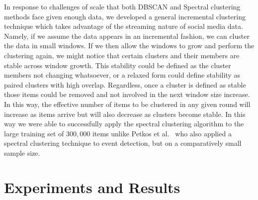 \documentclass{../acm_proc_article-me11_tweaked}
\begin{document}
In response to challenges of scale that both DBSCAN and Spectral clustering methods face given enough data, we developed a general incremental clustering technique which takes advantage of the streaming nature of social media data. Namely, if we assume the data appears in an incremental fashion, we can cluster the data in small windows. If we then allow the windows to grow and perform the clustering again, we might notice that certain clusters and their members are stable across window growth. This stability could be defined as the cluster members not changing whatsoever, or a relaxed form could define stability as paired clusters with high overlap. Regardless, once a cluster is defined as stable those items could be removed and not involved in the next window size increase. In this way, the effective number of items to be clustered in any given round will increase as items arrive but will also decrease as clusters become stable. In this way we were able to successfully apply the spectral clustering algorithm to the large training set of $300,000$ items unlike Petkos et al.~\cite{Petkos:2012:SED:2324796.2324825} who also applied a spectral clustering technique to event detection, but on a comparatively small sample size.


\section{Experiments and Results} %
\label{sec:experiments}
\end{document}
